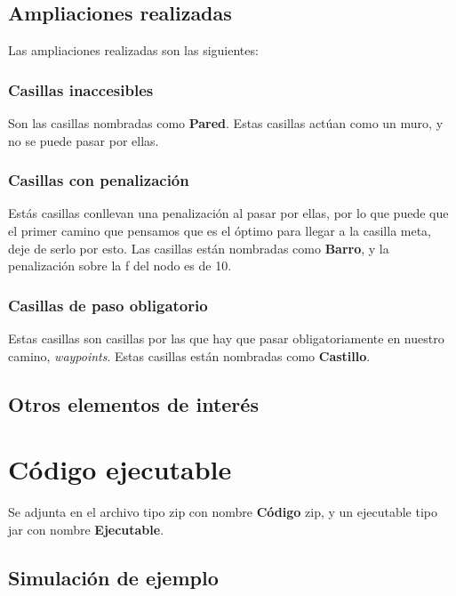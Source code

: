 \documentclass[12pt]{article}
\begin{document}
\subsection{Ampliaciones realizadas}
Las ampliaciones realizadas son las siguientes:
\subsubsection{Casillas inaccesibles}
Son las casillas nombradas como \textbf{Pared}. Estas casillas actúan como un muro, y no se puede pasar por ellas.
\subsubsection{Casillas con penalización}
Estás casillas conllevan una penalización al pasar por ellas, por lo que puede que el primer camino que pensamos que es el óptimo para llegar a la casilla meta, deje de serlo por esto. Las casillas están nombradas como \textbf{Barro}, y la penalización sobre la f del nodo es de 10.
\subsubsection{Casillas de paso obligatorio}
Estas casillas son casillas por las que hay que pasar obligatoriamente en nuestro camino, \textit{waypoints}. Estas casillas están nombradas como \textbf{Castillo}.
\subsection{Otros elementos de interés}

\section{Código ejecutable}
Se adjunta en el archivo tipo zip con nombre \textbf{Código} zip, y un ejecutable tipo jar con nombre \textbf{Ejecutable}.
\subsection{Simulación de ejemplo}
\end{document}
